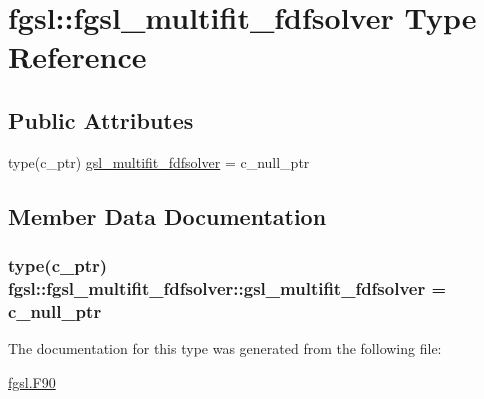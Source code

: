 \hypertarget{structfgsl_1_1fgsl__multifit__fdfsolver}{\section{fgsl\-:\-:fgsl\-\_\-multifit\-\_\-fdfsolver Type Reference}
\label{structfgsl_1_1fgsl__multifit__fdfsolver}
}
\subsection*{Public Attributes}
\begin{DoxyCompactItemize}
\item 
type(c\-\_\-ptr) \hyperlink{structfgsl_1_1fgsl__multifit__fdfsolver_ab546ab5dd9e98754df217de1b37d7475}{gsl\-\_\-multifit\-\_\-fdfsolver} = c\-\_\-null\-\_\-ptr
\end{DoxyCompactItemize}


\subsection{Member Data Documentation}
\hypertarget{structfgsl_1_1fgsl__multifit__fdfsolver_ab546ab5dd9e98754df217de1b37d7475}{
\subsubsection[{gsl\-\_\-multifit\-\_\-fdfsolver}]{\setlength{\rightskip}{0pt plus 5cm}type(c\-\_\-ptr) fgsl\-::fgsl\-\_\-multifit\-\_\-fdfsolver\-::gsl\-\_\-multifit\-\_\-fdfsolver = c\-\_\-null\-\_\-ptr}}\label{structfgsl_1_1fgsl__multifit__fdfsolver_ab546ab5dd9e98754df217de1b37d7475}


The documentation for this type was generated from the following file\-:\begin{DoxyCompactItemize}
\item 
\hyperlink{fgsl_8F90}{fgsl.\-F90}\end{DoxyCompactItemize}
